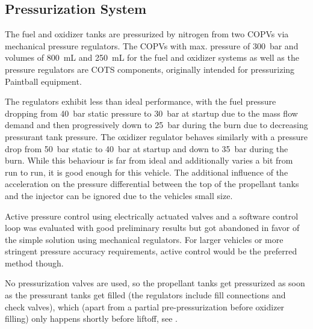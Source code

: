 \subsection{Pressurization System}

The fuel and oxidizer tanks are pressurized by nitrogen from two COPVs via mechanical pressure regulators. The COPVs with max. pressure of \SI{300}{\bar} and volumes of \SI{800}{\milli\liter} and \SI{250}{\milli\liter} for the fuel and oxidizer systems as well as the pressure regulators are COTS components, originally intended for pressurizing Paintball equipment.

The regulators exhibit less than ideal performance, with the fuel pressure dropping from \SI{40}{\bar} static pressure to \SI{30}{\bar} at startup due to the mass flow demand and then progressively down to \SI{25}{\bar} during the burn due to decreasing pressurant tank pressure. The oxidizer regulator behaves similarly with a pressure drop from \SI{50}{\bar} static to \SI{40}{\bar} at startup and down to \SI{35}{\bar} during the burn.
While this behaviour is far from ideal and additionally varies a bit from run to run, it is good enough for this vehicle.
The additional influence of the acceleration on the pressure differential between the top of the propellant tanks and the injector can be ignored due to the vehicles small size.

Active pressure control using electrically actuated valves and a software control loop was evaluated with good preliminary results but got abandoned in favor of the simple solution using mechanical regulators. For larger vehicles or more stringent pressure accuracy requirements, active control would be the preferred method though.

No pressurization valves are used, so the propellant tanks get pressurized as soon as the pressurant tanks get filled (the regulators include fill connections and check valves), which (apart from a partial pre-pressurization before oxidizer filling) only happens shortly before liftoff, see .

